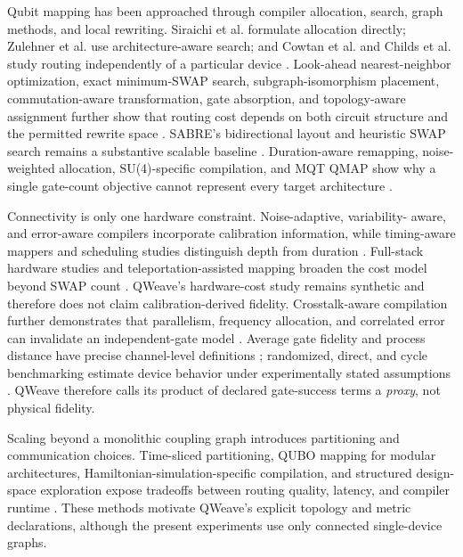 \documentclass[conference]{IEEEtran}
\begin{document}
Qubit mapping has been approached through compiler allocation, search, graph
methods, and local rewriting. Siraichi et al. formulate allocation directly;
Zulehner et al. use architecture-aware search; and Cowtan et al. and Childs et
al. study routing independently of a particular device
\cite{siraichi2018allocation,zulehner2019efficient,cowtan2019routing,
childs2019transformations}. Look-ahead nearest-neighbor optimization, exact
minimum-SWAP search, subgraph-isomorphism placement, commutation-aware
transformation, gate absorption, and topology-aware assignment further show
that routing cost depends on both circuit structure and the permitted rewrite
space \cite{wille2016lookahead,lye2015minimal,li2021subgraph,
itoko2020optimization,tan2021gateabsorption,steinberg2022topological}. SABRE's
bidirectional layout and heuristic SWAP search remains a substantive scalable
baseline \cite{li2019sabre,ibmsabre}.
Duration-aware remapping, noise-weighted allocation, SU(4)-specific compilation,
and MQT QMAP show why a single gate-count objective cannot represent every
target architecture \cite{deng2020codar,finigan2018allocation,
zulehner2019su4,wille2023qmap}.

Connectivity is only one hardware constraint. Noise-adaptive, variability-
aware, and error-aware compilers incorporate calibration information, while
timing-aware mappers and scheduling studies distinguish depth from duration
\cite{murali2019noise,tannu2019variability,nishio2020erroraware,
lao2022timing,guerreschi2018twostep}. Full-stack hardware studies and
teleportation-assisted mapping broaden the cost model beyond SWAP count
\cite{murali2019fullstack,hillmich2021teleportation}. QWeave's hardware-cost
study remains synthetic and therefore does not claim calibration-derived
fidelity. Crosstalk-aware compilation further demonstrates that parallelism,
frequency allocation, and correlated error can invalidate an independent-gate
model \cite{ding2020crosstalk,hua2022cqc}. Average gate fidelity and process
distance have precise channel-level definitions \cite{nielsen2002fidelity,
gilchrist2005distance}; randomized, direct, and cycle benchmarking estimate
device behavior under experimentally stated assumptions
\cite{magesan2012rb,wallman2016randomized,erhard2019cycle,
proctor2019direct,hashim2021randomized}. QWeave therefore calls its product of
declared gate-success terms a \emph{proxy}, not physical fidelity.

Scaling beyond a monolithic coupling graph introduces partitioning and
communication choices. Time-sliced partitioning, QUBO mapping for modular
architectures, Hamiltonian-simulation-specific compilation, and structured
design-space exploration expose tradeoffs between routing quality, latency,
and compiler runtime \cite{baker2020partitioning,bandic2023qubo,
laobrowne2021twoqan,bandic2020dse}. These methods motivate QWeave's explicit
topology and metric declarations, although the present experiments use only
connected single-device graphs.
\end{document}
